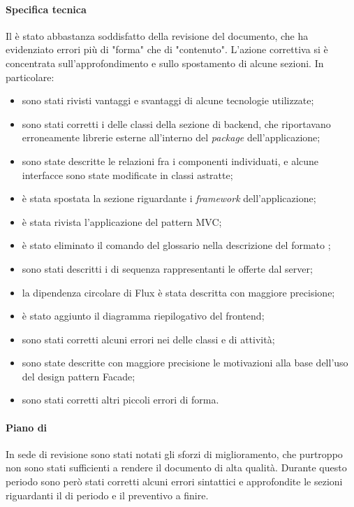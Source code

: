 \paragraph*{Specifica tecnica}
Il  è stato abbastanza soddisfatto della revisione del documento, che ha evidenziato errori più di "forma" che di "contenuto". L'azione correttiva si è concentrata sull'approfondimento e sullo spostamento di alcune sezioni. In particolare:
\begin{itemize}
\item sono stati rivisti vantaggi e svantaggi di alcune tecnologie utilizzate;
\item sono stati corretti i  delle classi della sezione di backend, che riportavano erroneamente librerie esterne all'interno del \textit{package} dell'applicazione;
\item sono state descritte le relazioni fra i componenti individuati, e alcune interfacce sono state modificate in classi astratte;
\item è stata spostata la sezione riguardante i \textit{framework} dell'applicazione;
\item è stata rivista l'applicazione del pattern MVC;
\item è stato eliminato il comando del glossario nella descrizione del formato ;
\item sono stati descritti i  di sequenza rappresentanti le  offerte dal server;
\item la dipendenza circolare di Flux è stata descritta con maggiore precisione;
\item è stato aggiunto il diagramma riepilogativo del frontend;
\item sono stati corretti alcuni errori nei  delle classi e di attività;
\item sono state descritte con maggiore precisione le motivazioni alla base dell'uso del design pattern Facade;
\item sono stati corretti altri piccoli errori di forma.
\end{itemize}

\paragraph*{Piano di }
In sede di revisione sono stati notati gli sforzi di miglioramento, che purtroppo non sono stati sufficienti a rendere il documento di alta qualità. Durante questo periodo sono però stati corretti alcuni errori sintattici e approfondite le sezioni riguardanti il  di periodo e il preventivo a finire. 

